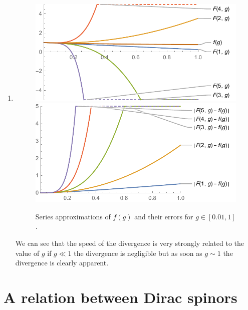 \documentclass[10pt,a4paper]{article}
\begin{document}
\begin{enumerate}
\item \begin{figure}
\centering
\includegraphics[width=0.44 \textwidth]{approx_series}
\hspace{0.1\textwidth}
\includegraphics[width=0.44 \textwidth]{error_series}
\caption{Series approximations of $f(g)$ and their errors for $g \in [0.01, 1]$.}
\end{figure}

We can see that the speed of the divergence is very strongly related to the value of $g$ if $g \ll 1$ the divergence is negligible but as soon as $g \sim 1$ the divergence is clearly apparent. 

\end{enumerate}


\section{A relation between Dirac spinors}
\end{document}
